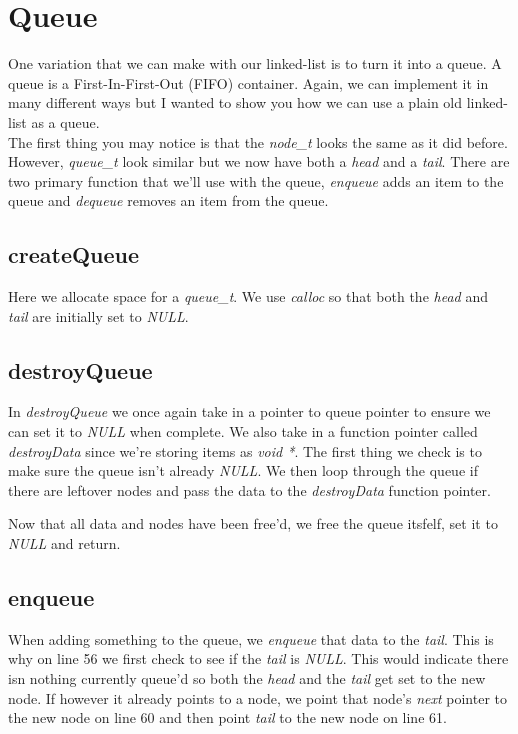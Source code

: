 \documentclass[../main.tex]{subfiles}
\begin{document}
	
	\section{Queue}
	One variation that we can make with our linked-list is to turn it into a queue.  A queue is a First-In-First-Out (FIFO) container.  Again, we can implement it in many different ways but I wanted to show you how we can use a plain old linked-list as a queue.\\
	
	
	
	The first thing you may notice is that the \textit{node\_t} looks the same as it did before.  However, \textit{queue\_t} look similar but we now have both a \textit{head} and a \textit{tail}.  There are two primary function that we'll use with the queue, \textit{enqueue} adds an item to the queue and \textit{dequeue} removes an item from the queue.\\
	
	
	
	\subsection{createQueue}
	Here we allocate space for a \textit{queue\_t}.  We use \textit{calloc} so that both the \textit{head} and \textit{tail} are initially set to \textit{NULL}.
	
	\subsection{destroyQueue}
	In \textit{destroyQueue} we once again take in a pointer to queue pointer to ensure we can set it to \textit{NULL} when complete.  We also take in a function pointer called \textit{destroyData} since we're storing items as \textit{void *}.  The first thing we check is to make sure the queue isn't already \textit{NULL}.  We then loop through the queue if there are leftover nodes and pass the data to the \textit{destroyData} function pointer.  
	
	Now that all data and nodes have been free'd, we free the queue itsfelf, set it to \textit{NULL} and return.
	
	\subsection{enqueue}
	When adding something to the queue, we \textit{enqueue} that data to the \textit{tail}.  This is why on line 56 we first check to see if the \textit{tail} is \textit{NULL}.  This would indicate there isn nothing currently queue'd so both the \textit{head} and the \textit{tail} get set to the new node.  If however it already points to a node, we point that node's \textit{next} pointer to the new node on line 60 and then point \textit{tail} to the new node on line 61.
	
\end{document}
